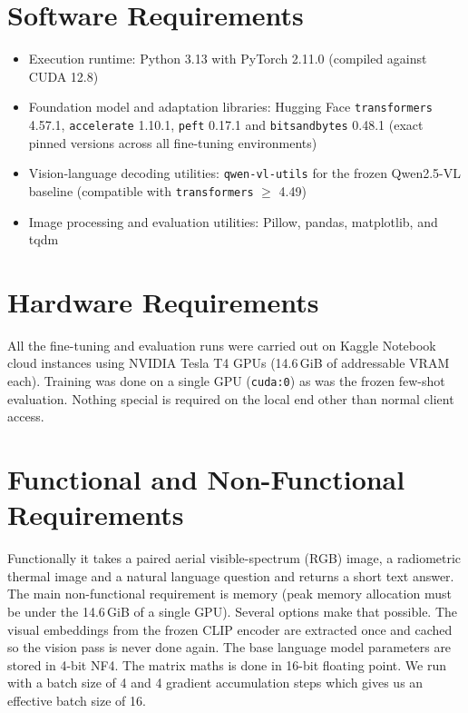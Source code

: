 \documentclass[12pt]{report}
\begin{document}
\section{Software Requirements}
\begin{itemize}[leftmargin=0.5in, itemsep=2pt]
  \item Execution runtime: Python 3.13 with PyTorch 2.11.0 (compiled against CUDA 12.8)
  \item Foundation model and adaptation libraries: Hugging Face \texttt{transformers} 4.57.1, \texttt{accelerate} 1.10.1, \texttt{peft} 0.17.1 and \texttt{bitsandbytes} 0.48.1 (exact pinned versions across all fine-tuning environments)
  \item Vision-language decoding utilities: \texttt{qwen-vl-utils} for the frozen Qwen2.5-VL baseline (compatible with \texttt{transformers} $\ge$ 4.49)
  \item Image processing and evaluation utilities: Pillow, pandas, matplotlib, and tqdm
\end{itemize}
\section{Hardware Requirements}
All the fine-tuning and evaluation runs were carried out on Kaggle Notebook cloud instances using NVIDIA Tesla T4 GPUs (14.6\,GiB of addressable VRAM each). Training was done on a single GPU (\texttt{cuda:0}) as was the frozen few-shot evaluation. Nothing special is required on the local end other than normal client access.
\section{Functional and Non-Functional Requirements}
Functionally it takes a paired aerial visible-spectrum (RGB) image, a radiometric thermal image and a natural language question and returns a short text answer. The main non-functional requirement is memory (peak memory allocation must be under the 14.6\,GiB of a single GPU). Several options make that possible. The visual embeddings from the frozen CLIP encoder are extracted once and cached so the vision pass is never done again. The base language model parameters are stored in 4-bit NF4. The matrix maths is done in 16-bit floating point. We run with a batch size of 4 and 4 gradient accumulation steps which gives us an effective batch size of 16.
\end{document}
